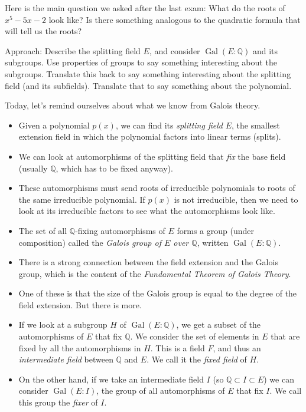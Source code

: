 \documentclass[12pt]{article}
\theoremstyle{plain}
\theoremstyle{definition}
\theoremstyle{remark}
\def\Q{\mathbb Q}
\DeclareMathOperator{\Gal}{Gal}
\begin{document}
Here is the main question we asked after the last exam: What do the roots of $x^5 - 5x - 2$ look like?  Is there something analogous to the quadratic formula that will tell us the roots?

Approach: Describe the splitting field $E$, and consider $\Gal(E:\Q)$ and its subgroups.  Use properties of groups to say something interesting about the subgroups.  Translate this back to say something interesting about the splitting field (and its subfields).  Translate that to say something about the polynomial.

Today, let's remind ourselves about what we know from Galois theory.

\begin{itemize}
\item Given a polynomial $p(x)$, we can find its \emph{splitting field} $E$, the smallest extension field in which the polynomial factors into linear terms (splits). 
\item We can look at automorphisms of the splitting field that \emph{fix} the base field (usually $\Q$, which has to be fixed anyway). 
\item These automorphisms must send roots of irreducible polynomials to roots of the same irreducible polynomial. If $p(x)$ is not irreducible, then we need to look at its irreducible factors to see what the automorphisms look like.
\item The set of all $\Q$-fixing automorphisms of $E$ forms a group (under composition) called the \emph{Galois group of $E$ over $\Q$}, written $\Gal(E:\Q)$.
\item There is a strong connection between the field extension and the Galois group, which is the content of the \emph{Fundamental Theorem of Galois Theory}.
\item One of these is that the size of the Galois group is equal to the degree of the field extension.  But there is more.
\item If we look at a subgroup $H$ of $\Gal(E:\Q)$, we get a subset of the automorphisms of $E$ that fix $\Q$.  We consider the set of elements in $E$ that are fixed by all the automorphisms in $H$.  This is a field $F$, and thus an \emph{intermediate field} between $\Q$ and $E$.  We call it the \emph{fixed field} of $H$.  

\item On the other hand, if we take an intermediate field $I$ (so $\Q \subset I \subset E$) we can consider $\Gal(E:I)$, the group of all automorphisms of $E$ that fix $I$.  We call this group the \emph{fixer} of $I$.


\end{itemize}
\end{document}
